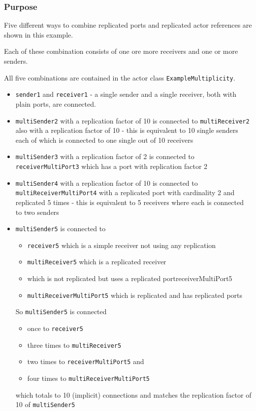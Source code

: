 \subsubsection{Purpose}

Five different ways to combine replicated ports and replicated actor references
are shown in this example.

Each of these combination consists of one ore more receivers and one or more
senders.

All five combinations are contained in the actor class \texttt{ExampleMultiplicity}.

\begin{itemize}
\item \texttt{sender1} and \texttt{receiver1} - a single sender and a single
receiver, both with plain ports, are connected.
\item \texttt{multiSender2} with a replication factor of 10 is connected to
\texttt{multiReceiver2} also with a replication factor of 10 - this is
equivalent to 10 single senders each of which is connected to one single out
of 10 receivers
\item \texttt{multiSender3} with a replication factor of 2 is connected to
\texttt{receiverMultiPort3} which has a port with replication factor 2
\item \texttt{multiSender4} with a replication factor of 10 is connected to
\texttt{multiReceiverMultiPort4} with a replicated port with cardinality 2
and replicated 5 times - this is equivalent to 5 receivers where each is connected
to two senders
\item \texttt{multiSender5} is connected to
\begin{itemize}
\item \texttt{receiver5} which is a simple receiver not using any replication
\item \texttt{multiReceiver5} which is a replicated receiver
\item \texttt{} which is not replicated but uses a replicated portreceiverMultiPort5
\item \texttt{multiReceiverMultiPort5} which is replicated and has replicated ports
\end{itemize}
So \texttt{multiSender5} is connected
\begin{itemize}
\item once to \texttt{receiver5}
\item three times to \texttt{multiReceiver5}
\item two times to \texttt{receiverMultiPort5} and
\item four times to \texttt{multiReceiverMultiPort5}
\end{itemize}
which totals to 10 (implicit) connections and matches the replication factor of
10 of \texttt{multiSender5}
\end{itemize}

